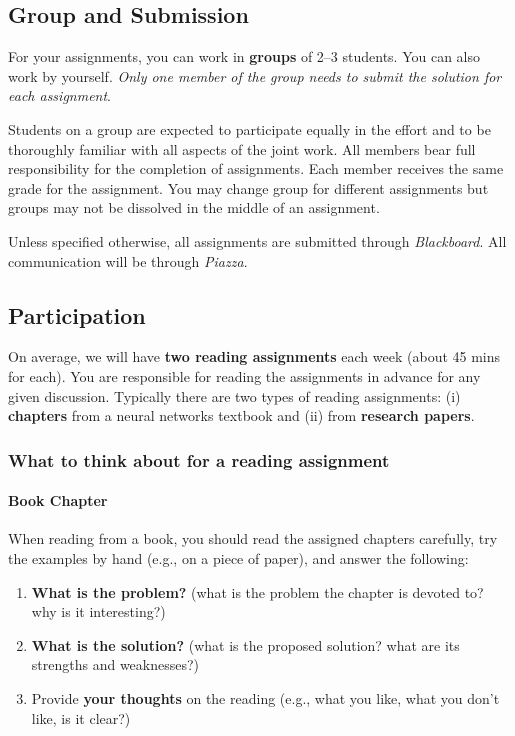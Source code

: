 \documentclass[11pt]{article}
\begin{document}
\subsection*{Group and Submission} 
For your assignments, you can work in \textbf{groups} of 2--3 students.  You can also work by yourself. \emph{Only one member of the group needs to submit the solution for each assignment}. 

Students on a group are expected to participate equally in the effort
    and to be thoroughly familiar with all aspects of the joint work.
    All members bear full responsibility for the completion of
    assignments. 
    Each member receives the same grade for the assignment.  You may change group for different assignments but groups may not be dissolved in the middle of an assignment.


Unless specified otherwise, all assignments are submitted through \emph{Blackboard}.  All communication will be through \emph{Piazza}.
\subsection{Participation}
\label{sec:org16c195f}

On average, we will have \textbf{\textbf{two reading assignments}} each week (about 45 mins for each). 
You are responsible for reading the assignments in advance for any given discussion.  Typically there are two types of reading assignments:  (i) \textbf{chapters} from a neural networks textbook and (ii) from \textbf{research papers}.  

\subsubsection{What to think about for a reading assignment}\label{sec:reading}

\paragraph{Book Chapter} When reading from a book, you should read the assigned chapters carefully, try the examples by hand (e.g., on a piece of paper), and answer the following:
\begin{enumerate}
    \item  \textbf{What is the problem?} (what is the problem the chapter is devoted to? why is it interesting?)
    \item \textbf{What is the solution?} (what is the proposed solution? what are its strengths and weaknesses?)
    \item  Provide \textbf{your thoughts} on the reading (e.g., what you like, what you don't like, is it clear?)

\end{enumerate}    
\end{document}
